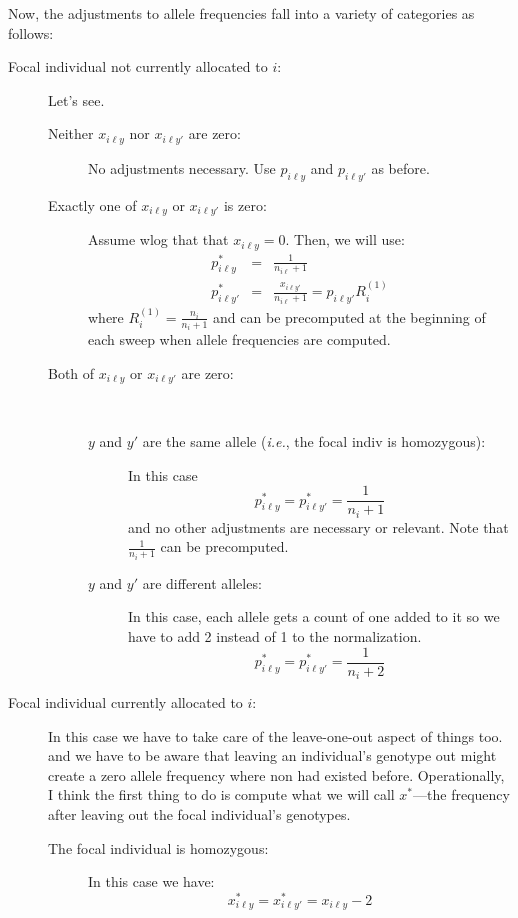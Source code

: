 \documentclass[11pt]{article}
\newcommand{\ie}{{\em i.e.},\xspace }
\begin{document}
Now, the adjustments to allele frequencies fall into a variety of categories as follows:
\begin{description}
	\item[Focal individual not currently allocated to $i$:] Let's see. 
	\begin{description}
		\item [Neither $x_{i\ell y}$ nor $x_{i\ell y'}$ are zero:] No adjustments necessary.  Use $p_{i\ell y}$ and $p_{i\ell y'}$ as before.
		\item [Exactly one of $x_{i\ell y}$ or $x_{i\ell y'}$ is zero:] Assume wlog that that $x_{i\ell y} = 0$.  Then, we will use:
		\begin{eqnarray*}
			p^*_{i\ell y} & = & \frac{1}{n_{i\ell} + 1} \\
			p^*_{i\ell y'} & = & \frac{x_{i\ell y'}}{n_{i\ell} + 1} = p_{i\ell y'} R_i^{(1)}
		\end{eqnarray*}
		where $R_i^{(1)} = \frac{n_i}{n_i + 1}$ and can be precomputed at the beginning of each sweep when allele frequencies are computed.
		\item [Both of $x_{i\ell y}$ or $x_{i\ell y'}$ are zero:] ~
		\begin{description}
			\item [$y$ and $y'$ are the same allele (\ie the focal indiv is homozygous):] In this case
			\[
				p^*_{i\ell y} = p^*_{i\ell y'} = \frac{1}{n_i + 1}
			\]
			and no other adjustments are necessary or relevant.  Note that $\frac{1}{n_i + 1}$ can be precomputed.
			\item [$y$ and $y'$ are different alleles:] In this case, each allele gets a count of one added to it
			so we have to add 2 instead of 1 to the normalization.
			\[
				p^*_{i\ell y} = p^*_{i\ell y'} = \frac{1}{n_i + 2}
			\]
		\end{description}
	\end{description}
	\item [Focal individual currently allocated to $i$:] In this case we have to take care of the leave-one-out aspect of things too.
	and we have to be aware that leaving an individual's genotype out might create a zero allele frequency where non had existed before.  
	Operationally, I think the first thing to do is compute what we will call $x^*$---the frequency after leaving out the focal
	individual's genotypes. 
	\begin{description}
		\item [The focal individual is homozygous:] In this case we have:
		\[
			x^*_{i\ell y} = x^*_{i\ell y'} = x_{i\ell y} - 2
		\]
	\end{description}

\end{description}




 
\end{document}
